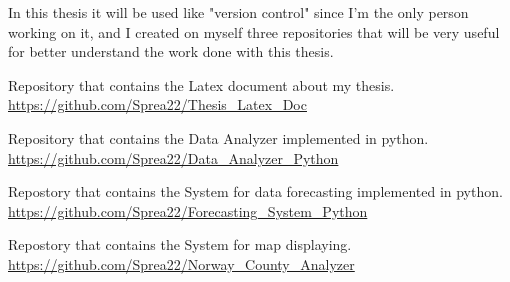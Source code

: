 In this thesis it will be used like "version control" since I'm the only person working on it, and I created on myself three repositories that will be very useful for better understand the work done with this thesis.

Repository that contains the Latex document about my thesis.\\
\url{https://github.com/Sprea22/Thesis_Latex_Doc}

Repository that contains the Data Analyzer implemented in python.\\
\url{https://github.com/Sprea22/Data_Analyzer_Python}

Repostory that contains the System for data forecasting implemented in python.\\
\url{https://github.com/Sprea22/Forecasting_System_Python}

Repostory that contains the System for map displaying.\\
\url{https://github.com/Sprea22/Norway_County_Analyzer}
